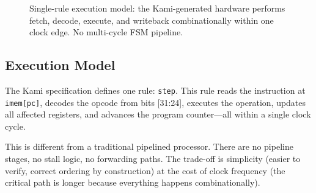 
\begin{figure}[h]
\centering
{}
\caption{Single-rule execution model: the Kami-generated hardware performs fetch, decode, execute, and writeback combinationally within one clock edge. No multi-cycle FSM pipeline.}
\end{figure}

\subsection{Execution Model}

The Kami specification defines one rule: \texttt{step}. This rule reads the instruction at \texttt{imem[pc]}, decodes the opcode from bits [31:24], executes the operation, updates all affected registers, and advances the program counter---all within a single clock cycle.

This is different from a traditional pipelined processor. There are no pipeline stages, no stall logic, no forwarding paths. The trade-off is simplicity (easier to verify, correct ordering by construction) at the cost of clock frequency (the critical path is longer because everything happens combinationally).

